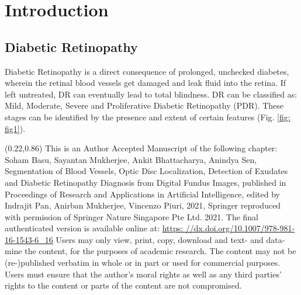 \documentclass{svproc}
\begin{document}
\section{Introduction}
\subsection{Diabetic Retinopathy}
Diabetic Retinopathy is a direct consequence of prolonged, unchecked diabetes, wherein the retinal blood vessels get damaged and leak fluid into the retina. If left untreated, DR can eventually lead to total blindness. DR can be classified as: Mild, Moderate, Severe and Proliferative Diabetic Retinopathy (PDR). These stages can be identified by the presence and extent of certain features (Fig. \ref{fig: fig1}).











\setlength{\TPHorizModule}{\paperwidth}\setlength{\TPVertModule}{\paperheight}
\TPMargin{5pt}

\newcommand{\copyrightstatement}{
    \begin{textblock}{0.57}(0.22,0.86)
         \noindent
         \scriptsize This is an Author Accepted Manuscript of the following chapter: Soham Basu, Sayantan Mukherjee, Ankit Bhattacharya,  Anindya Sen, Segmentation of Blood Vessels, Optic Disc Localization, Detection of Exudates and Diabetic Retinopathy Diagnosis from Digital Fundus Images, published in Proceedings of Research and Applications in Artificial Intelligence, edited by Indrajit Pan, Anirban Mukherjee, Vincenzo Piuri, 2021, Springer reproduced with permission of Springer Nature Singapore Pte Ltd. 2021. 
         The final authenticated version is available online at: \href{https://dx.doi.org/10.1007/978-981-16-1543-6\_16}{https: //dx.doi.org/10.1007/978-981-16-1543-6\_16}
         Users may only view, print, copy, download and text- and data-mine the content, for the purposes of academic research. 
         The content may not be (re-)published verbatim in whole or in part or used for commercial purposes. Users must ensure that the author’s moral rights as well as any third parties’ rights to the content or parts of the content are not compromised.
         
    \end{textblock}
}

\copyrightstatement
\end{document}
